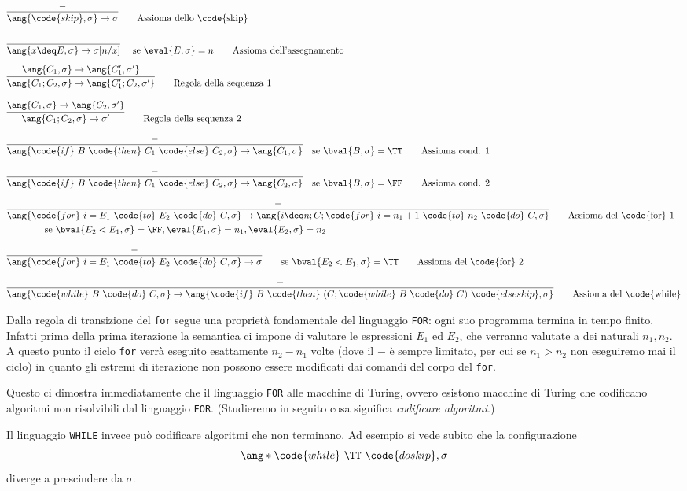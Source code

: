 \begin{align*}
    &\infer{\ang{\code{skip}, \sigma} \to \sigma}{\blank} \tag*{Assioma dello \code{skip}}\\[8pt]
    &\infer{\ang{x \deq E, \sigma} \to \sigma[n/x]}{\blank} \quad \text{ se } \eval{E, \sigma} = n \tag*{Assioma dell'assegnamento}\\[5pt]
    &\infer{\ang{C_1;C_2, \sigma} \to \ang{C_1';C_2, \sigma'}}{\ang{C_1, \sigma} \to \ang{C_1', \sigma'}} \tag*{Regola della sequenza 1}\\[8pt]
    &\infer{\ang{C_1;C_2, \sigma}\to \sigma'}{\ang{C_1, \sigma}  \to \ang{C_2, \sigma'}} \tag*{Regola della sequenza 2}\\[8pt]
    &\infer{\ang{\code{if}\ B\ \code{then}\ C_1\ \code{else}\ C_2, \sigma} \to \ang{C_1, \sigma}}{\blank} \quad \text{se } \bval{B, \sigma} = \TT \tag*{Assioma cond. 1}\\[8pt]
    &\infer{\ang{\code{if}\ B\ \code{then}\ C_1\ \code{else}\ C_2, \sigma} \to \ang{C_2, \sigma}}{\blank} \quad \text{se } \bval{B, \sigma} = \FF \tag*{Assioma cond. 2}\\[8pt]
    &\infer{\ang{\code{for}\ i = E_1\ \code{to}\ E_2\ \code{do}\ C, \sigma} \to \ang{i \deq n; C; \code{for}\ i = n_1 + 1\ \code{to}\ n_2\ \code{do}\ C, \sigma}}{\blank} \tag*{Assioma del \code{for}\ 1}\\
    & \qquad\qquad\text{se } \bval{E_2 < E_1, \sigma} = \FF, \eval{E_1, \sigma} = n_1, \eval{E_2, \sigma} = n_2\\[8pt]
    &\infer{\ang{\code{for}\ i = E_1\ \code{to}\ E_2\ \code{do}\ C, \sigma} \to \sigma}{\blank} \qquad \text{se } \bval{E_2 < E_1, \sigma} = \TT \tag*{Assioma del \code{for}\ 2}\\[8pt]
    &\infer{\ang{\code{while}\ B\ \code{do}\ C, \sigma} \to \ang{\code{if}\ B\ \code{then}\ (C; \code{while}\ B\ \code{do}\ C)\ \code{else skip}, \sigma}}{\blank} \tag*{Assioma del \code{while}}
\end{align*}

Dalla regola di transizione del \texttt{for} segue una proprietà fondamentale del linguaggio \texttt{FOR}: ogni suo programma termina in tempo finito. Infatti prima della prima iterazione la semantica ci impone di valutare le espressioni $E_1$ ed $E_2$, che verranno valutate a dei naturali $n_1, n_2$. A questo punto il ciclo \texttt{for} verrà eseguito esattamente $n_2 - n_1$ volte (dove il $-$ è sempre limitato, per cui se $n_1 > n_2$ non eseguiremo mai il ciclo) in quanto gli estremi di iterazione non possono essere modificati dai comandi del corpo del \texttt{for}.

Questo ci dimostra immediatamente che il linguaggio \texttt{FOR}  alle macchine di Turing, ovvero esistono macchine di Turing che codificano algoritmi non risolvibili dal linguaggio \texttt{FOR}. (Studieremo in seguito cosa significa \emph{codificare algoritmi}.)

Il linguaggio \texttt{WHILE} invece può codificare algoritmi che non terminano. Ad esempio si vede subito che la configurazione \[
    \ang*{\code{while}\ \TT\ \code{do skip}, \sigma}
\] diverge a prescindere da $\sigma$. 